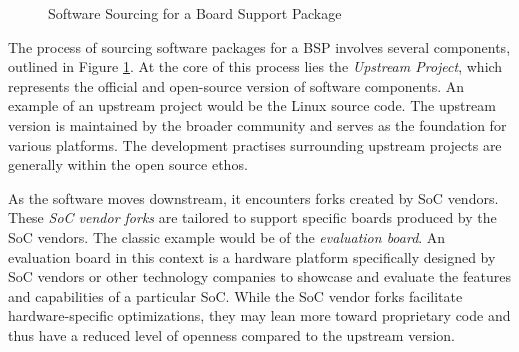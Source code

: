 \begin{figure}
	\centering
	\caption{Software Sourcing for a Board Support Package}
	\label{fig:software-versions}
\end{figure}

The process of sourcing software packages for a BSP involves several components, outlined in Figure \ref{fig:software-versions}. At the core of this process lies the \textit{Upstream Project}, which represents the official and open-source version of software components. An example of an upstream project would be the Linux source code. The upstream version is maintained by the broader community and serves as the foundation for various platforms. The development practises surrounding upstream projects are generally within the open source ethos.

As the software moves downstream, it encounters forks created by SoC vendors. These \textit{SoC vendor forks} are tailored to support specific boards produced by the SoC vendors. The classic example would be of the \textit{evaluation board}. An evaluation board in this context is a hardware platform specifically designed by SoC vendors or other technology companies to showcase and evaluate the features and capabilities of a particular SoC. While the SoC vendor forks facilitate hardware-specific optimizations, they may lean more toward proprietary code and thus have a reduced level of openness compared to the upstream version.

